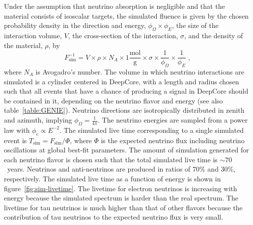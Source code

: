 Under the assumption that neutrino absorption is negligible and that the material consists of isoscalar targets, the simulated fluence is given by the chosen probability density in the direction and energy, $\phi_\Omega \times \phi_E$,  the size of the interaction volume, $V$, the cross-section of the interaction, $\sigma$, and the density of the material, $\rho$, by
\begin{equation}
    F_{\mathrm{sim}}^{-1} = V \times \rho \times N_A \times 1\frac{\mathrm{mol}}{\mathrm{g}} \times \sigma \times \frac{1}{\phi_\Omega} \times \frac{1}{\phi_E}\;,
\end{equation}
where $N_A$ is Avogadro's number. The volume in which neutrino interactions are simulated is a cylinder centered in DeepCore, with a length and radius chosen such that all events that have a chance of producing a signal in DeepCore should be contained in it, depending on the neutrino flavor and energy (see also table~\ref{table:GENIE}). Neutrino directions are isotropically distributed in zenith and azimuth, implying $\phi_\Omega = \frac{1}{4\pi}$. The neutrino energies are sampled from a power law with $\phi_e \propto E^{-2}$. The simulated live time corresponding to a single simulated event is  $T_{\mathrm{sim}} =  F_{\mathrm{sim}} / \Phi$, where $\Phi$ is the expected neutrino flux including neutrino oscillations at global best-fit parameters. The amount of simulation generated for each neutrino flavor is chosen such that the total simulated live time is $\sim 70$~years. Neutrinos and anti-neutrinos are produced in ratios of 70\% and 30\%, respectively. The simulated live time as a function of energy is shown in figure~\ref{fig:sim-livetime}. The livetime for electron neutrinos is increasing with energy because the simulated spectrum is harder than the real spectrum. The livetime for tau neutrinos is much higher than that of other flavors because the contribution of tau neutrinos to the expected neutrino flux is very small.


